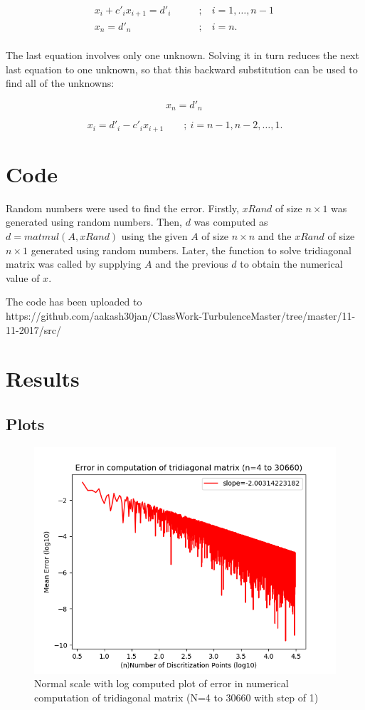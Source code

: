 \documentclass[preprint,12pt,3p]{elsarticle}
\begin{document}
\[\begin{array}{lcl}
x_i + c'_i x_{i + 1} = d'_i \qquad &;& \ i = 1, \ldots, n - 1 \\
x_n = d'_n \qquad &;& \ i = n. \\
\end{array}
\,\]

The last equation involves only one unknown. Solving it in turn reduces
the next last equation to one unknown, so that this backward
substitution can be used to find all of the unknowns:

\[x_n = d'_n\,\]

\[x_i = d'_i - c'_i x_{i + 1} \qquad ; \ i = n - 1, n - 2, \ldots, 1.\]



\section{Code}

Random numbers were used to find the error. Firstly, $xRand$ of size $n \times 1$ was generated using random numbers. Then, $d$ was computed as $d=matmul(A,xRand)$ using the given $A$ of size $n \times n$ and the $xRand$ of size $n \times 1$ generated using random numbers. Later, the function to solve tridiagonal matrix was called by supplying $A$ and the previous $d$ to obtain the numerical value of $x$. 

The code has been uploaded to \\
https://github.com/aakash30jan/ClassWork-TurbulenceMaster/tree/master/11-11-2017/src/
\newpage
\section{Results}


\subsection{Plots}
 \begin{figure}[!htbp]
\centering
\includegraphics[width=0.7\linewidth]{data1_NPlog.png}
\caption{Normal scale with log computed plot of error in numerical computation of tridiagonal matrix (N=4 to 30660 with step of 1)}
\label{fig:data1_NPlog}
\end{figure}
\end{document}
